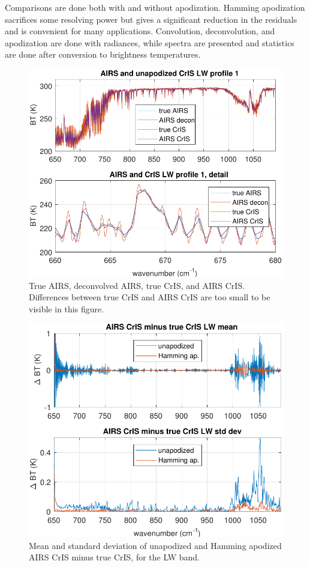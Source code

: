 \documentclass[journal]{IEEEtran}
\begin{document}
Comparisons are done both with and without apodization.  Hamming
apodization \cite{barn2000, wiki:wind} sacrifices some resolving
power but gives a significant reduction in the residuals and is
convenient for many applications.  Convolution, deconvolution, and
apodization are done with radiances, while spectra are presented and
statistics are done after conversion to brightness temperatures.

\begin{figure} %
  \centering
  \includegraphics[width=\linewidth]{figures/a2cris_spec_LW.pdf}
  \caption{True AIRS, deconvolved AIRS, true CrIS, and AIRS CrIS.
    Differences between true CrIS and AIRS CrIS are too small to be
    visible in this figure.}
  \label{specLW}
\end{figure}

\begin{figure} %
  \centering
  \includegraphics[width=\linewidth]{figures/a2cris_diff_LW.pdf}
  \caption{Mean and standard deviation of unapodized and Hamming
    apodized AIRS CrIS minus true CrIS, for the LW band.}
  \label{diffLW}
\end{figure}
\end{document}
